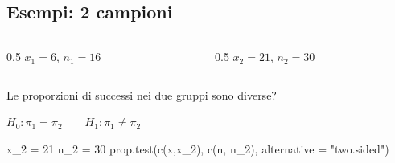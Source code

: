 \documentclass[
  ignorenonframetext,
  compress, aspectratio=149]{beamer}
\newenvironment{Shaded}{}{}
\newcommand{\AttributeTok}[1]{\textcolor[rgb]{0.00,0.34,0.68}{#1}}
\newcommand{\DecValTok}[1]{\textcolor[rgb]{0.69,0.50,0.00}{#1}}
\newcommand{\FunctionTok}[1]{\textcolor[rgb]{0.39,0.29,0.61}{#1}}
\newcommand{\NormalTok}[1]{\textcolor[rgb]{0.12,0.11,0.11}{#1}}
\newcommand{\OtherTok}[1]{\textcolor[rgb]{0.00,0.43,0.16}{#1}}
\newcommand{\StringTok}[1]{\textcolor[rgb]{0.75,0.01,0.01}{#1}}
\begin{document}
\subsection{Esempi: 2 campioni}\label{esempi-2-campioni}

\begin{frame}[fragile]{}
\label{section-15}
\begin{columns}[T]
\begin{column}{0.5\linewidth}
\(x_1 = 6\), \(n_1 = 16\)
\end{column}

\begin{column}{0.5\linewidth}
\(x_2 = 21\), \(n_2 = 30\)
\end{column}
\end{columns}

Le proporzioni di successi nei due gruppi sono diverse?

\(H_0: \pi_1 = \pi_2 \qquad H_1: \pi_1 \neq \pi_2\)

\begin{Shaded}
\begin{Highlighting}[]
\NormalTok{x\_2 }\OtherTok{=} \DecValTok{21}
\NormalTok{n\_2 }\OtherTok{=} \DecValTok{30}
\FunctionTok{prop.test}\NormalTok{(}\FunctionTok{c}\NormalTok{(x,x\_2), }\FunctionTok{c}\NormalTok{(n, n\_2), }\AttributeTok{alternative =} \StringTok{"two.sided"}\NormalTok{)}
\end{Highlighting}
\end{Shaded}
\end{frame}
\end{document}
